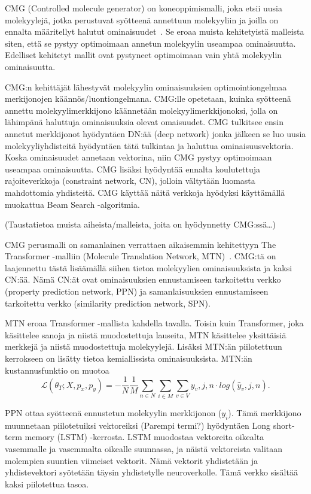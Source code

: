 \documentclass[finnish,twoside,censored,tkt,sw-line]{HYthesisML}
\begin{document}
CMG (Controlled molecule generator) on koneoppimismalli, joka etsii uusia molekyylejä, jotka perustuvat syötteenä annettuun molekyyliin ja joilla on ennalta määritellyt halutut ominaisuudet~\cite{ShinBonggun}.
Se eroaa muista kehitetyistä malleista siten, että se pystyy optimoimaan annetun molekyylin useampaa ominaisuutta.
Edelliset kehitetyt mallit ovat pystyneet optimoimaan vain yhtä molekyylin ominaisuutta.

CMG:n kehittäjät lähestyvät molekyylin ominaisuuksien optimointiongelmaa merkijonojen käännös/luontiongelmana.
CMG:lle opetetaan, kuinka syötteenä annettu molekyylimerkkijono käännetään molekyylimerkkijonoksi, jolla on lähimpänä haluttuja ominaisuuksia olevat omaisuudet.
CMG tulkitsee ensin annetut merkkijonot hyödyntäen DN:ää (deep network) jonka jälkeen se luo uusia molekyyliyhdisteitä hyödyntäen tätä tulkintaa ja haluttua ominaisuusvektoria.
Koska ominaisuudet annetaan vektorina, niin CMG pystyy optimoimaan useampaa ominaisuutta.
CMG lisäksi hyödyntää ennalta koulutettuja rajoiteverkkoja (constraint network, CN), jolloin vältytään luomasta mahdottomia yhdisteitä.
CMG käyttää näitä verkkoja hyödyksi käyttämällä muokattua Beam Search -algoritmia.

(Taustatietoa muista aiheista/malleista, joita on hyödynnetty CMG:ssä\dots)

CMG perusmalli on samanlainen verrattaen aikaisemmin kehitettyyn The Transformer -malliin (Molecule Translation Network, MTN)~\cite{TheTransformer}.
CMG:tä on laajennettu tästä lisäämällä siihen tietoa molekyylien ominaisuuksista ja kaksi CN:ää.
Nämä CN:ät ovat ominaisuuksien ennustamiseen tarkoitettu verkko (property prediction network, PPN) ja samanlaisuuksien ennustamiseen tarkoitettu verkko (similarity prediction network, SPN).

MTN eroaa Transformer -mallista kahdella tavalla.
Toisin kuin Transformer, joka käsittelee sanoja ja niistä muodostettuja lauseita, MTN käsittelee yksittäisiä merkkejä ja niistä muodostettuja molekyylejä.
Lisäksi MTN:än piilotettuun kerrokseen on lisätty tietoa kemiallissista ominaisuuksista.
MTN:än kustannusfunktio on muotoa \[\mathcal{L} (\theta_T;X,p_x,p_y) = -\frac{1}{N}\frac{1}{M}\sum_{n \in N}\sum_{i \in M}\sum_{v \in V}y_v,j,n \cdot log(\hat{y}_v,j,n).\]

PPN ottaa syötteenä ennustetun molekyylin merkkijonon ($y_i$).
Tämä merkkijono muunnetaan piilotetuiksi vektoreiksi (Parempi termi?) hyödyntäen Long short-term memory (LSTM) -kerrosta.
LSTM muodostaa vektoreita oikealta vasemmalle ja vasemmalta oikealle suunnassa, ja näistä vektoreista valitaan molempien suuntien viimeiset vektorit.
Nämä vektorit yhdistetään ja yhdistevektori syötetään täysin yhdistetylle neuroverkolle.
Tämä verkko sisältää kaksi piilotettua tasoa.
\end{document}
